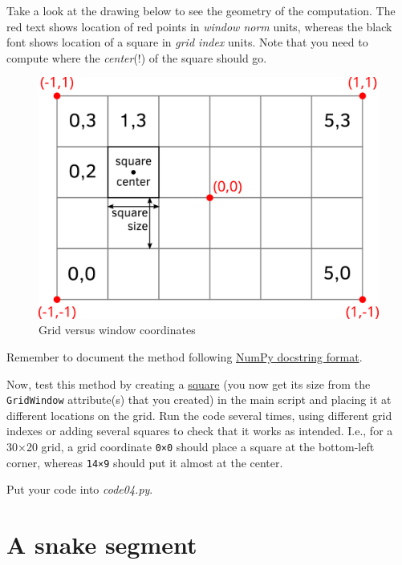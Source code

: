 \documentclass[
]{book}
\begin{document}
Take a look at the drawing below to see the geometry of the computation. The red text shows location of red points in \emph{window norm} units, whereas the black font shows location of a square in \emph{grid index} units. Note that you need to compute where the \emph{center}(!) of the square should go.

\begin{figure}
\includegraphics[width=16.49in]{images/snake-grid} \caption{Grid versus window coordinates}\label{fig:unnamed-chunk-2}
\end{figure}

Remember to document the method following \href{https://numpydoc.readthedocs.io/en/latest/format.html}{NumPy docstring format}.

Now, test this method by creating a \href{https://psychopy.org/api/visual/rect.html\#psychopy.visual.rect.Rect}{square} (you now get its size from the \texttt{GridWindow} attribute(s) that you created) in the main script and placing it at different locations on the grid. Run the code several times, using different grid indexes or adding several squares to check that it works as intended. I.e., for a 30×20 grid, a grid coordinate \texttt{0×0} should place a square at the bottom-left corner, whereas \texttt{14×9} should put it almost at the center.

Put your code into \emph{code04.py}.

\hypertarget{a-snake-segment}{%
\section{A snake segment}\label{a-snake-segment}}
\end{document}
